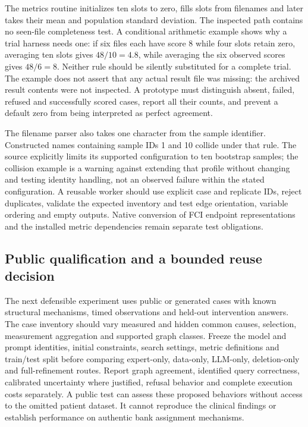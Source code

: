 The metrics routine initializes ten slots to zero, fills slots from filenames
and later takes their mean and population standard deviation. The inspected
path contains no seen-file completeness test. A conditional arithmetic example
shows why a trial harness needs one: if six files each have score 8 while four
slots retain zero, averaging ten slots gives $48/10=4.8$, while averaging the
six observed scores gives $48/6=8$. Neither rule should be silently substituted
for a complete trial. The example does not assert that any actual result file
was missing: the archived result contents were not inspected. A prototype
must distinguish absent, failed, refused and successfully scored cases, report
all their counts, and prevent a default zero from being interpreted as perfect
agreement.~\citep{exec24_ecmo_code,exec24_ecmo_reference}

The filename parser also takes one character from the sample identifier.
Constructed names containing sample IDs 1 and 10 collide under that rule.
The source explicitly limits its supported configuration to ten bootstrap
samples; the collision example is a warning against extending that profile
without changing and testing identity handling, not an observed failure within
the stated configuration. A reusable worker should use explicit case and
replicate IDs, reject duplicates, validate the expected inventory and test
edge orientation, variable ordering and empty outputs. Native conversion of
FCI endpoint representations and the installed metric dependencies remain
separate test obligations.~\citep{exec24_ecmo_code,exec24_ecmo_reference}

\subsection{Public qualification and a bounded reuse decision}
The next defensible experiment uses public or generated cases with known
structural mechanisms, timed observations and held-out intervention answers.
The case inventory should vary measured and hidden common causes, selection,
measurement aggregation and supported graph classes. Freeze the model and
prompt identities, initial constraints, search settings, metric definitions
and train/test split before comparing expert-only, data-only, LLM-only,
deletion-only and full-refinement routes. Report graph agreement, identified
query correctness, calibrated uncertainty where justified, refusal behavior
and complete execution costs separately. A public test can assess these
proposed behaviors without access to the omitted patient dataset. It cannot
reproduce the clinical findings or establish performance on authentic bank
assignment mechanisms.~\citep{exec24_ecmo_reference}

